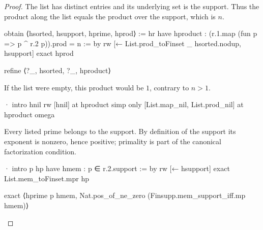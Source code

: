 \begin{proof}
  The list has distinct entries and its underlying set is the support.
  Thus the product along the list equals the product over the support, which is $n$.

  \begin{lean}
    obtain ⟨hsorted, hsupport, hprime, hprod⟩ := hr
    have hproduct : (r.1.map (fun p => p ^ r.2 p)).prod = n := by
      rw [← List.prod_toFinset _ hsorted.nodup, hsupport]
      exact hprod

    refine ⟨?_, hsorted, ?_, hproduct⟩
  \end{lean}

  If the list were empty, this product would be $1$, contrary to $n>1$.

  \begin{lean}
    · intro hnil
      rw [hnil] at hproduct
      simp only [List.map_nil, List.prod_nil] at hproduct
      omega
  \end{lean}

  Every listed prime belongs to the support.
  By definition of the support its exponent is nonzero, hence positive; primality is part of the
  canonical factorization condition.

  \begin{lean}
    · intro p hp
      have hmem : p ∈ r.2.support := by
        rw [← hsupport]
        exact List.mem_toFinset.mpr hp

      exact ⟨hprime p hmem, Nat.pos_of_ne_zero (Finsupp.mem_support_iff.mp hmem)⟩
  \end{lean}

\end{proof}
